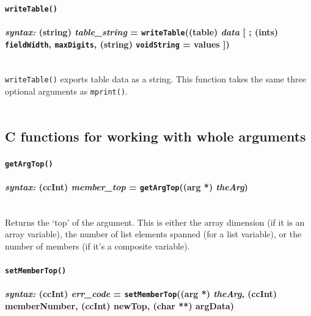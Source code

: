 \documentclass{article}
\begin{document}
\paragraph{\texttt{writeTable()}\\\\
\normalfont \emph{syntax: } (string) \emph{table\_string} = \texttt{writeTable}((table) \emph{data} [ ; (ints) \texttt{fieldWidth}, \texttt{maxDigits}, (string) \texttt{voidString} = values ])\\\\}

\texttt{writeTable()} exports table data as a string.  This function takes the same three optional arguments as \verb#mprint()#.\\\\





\subsection{C functions for working with whole arguments\\} 

\paragraph{\texttt{getArgTop()}\\\\
\normalfont \emph{syntax: } (ccInt) \emph{member\_top} = \texttt{getArgTop}((arg *) \emph{theArg})\\\\}

Returns the `top' of the argument.  This is either the array dimension (if it is an array variable), the number of list elements spanned (for a list variable), or the number of members (if it's a composite variable).\\



\paragraph{\texttt{setMemberTop()}\\\\
\normalfont \emph{syntax: } (ccInt) \emph{err\_code} = \texttt{setMemberTop}((arg *) \emph{theArg}, (ccInt) memberNumber, (ccInt) newTop, (char **) argData)\\\\}
\end{document}
